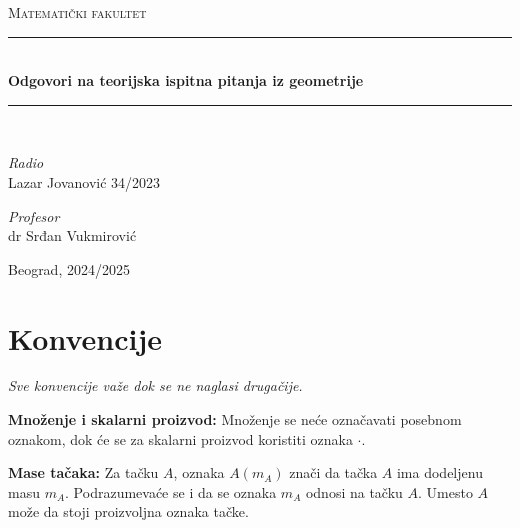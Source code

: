 \documentclass[12pt]{article}
\begin{document}
\begin{titlepage}

    \newcommand{\HRule}{\rule{\linewidth}{0.4mm}}
    \center
    \textsc{\LARGE Matematički fakultet}\\[5cm]

    \HRule\\[0.4cm]
    {\LARGE\bfseries Odgovori na teorijska ispitna pitanja iz geometrije}\\[0.2cm]
    \HRule\\[2cm]

    \vspace{17\baselineskip}
    \begin{minipage}[t]{0.4\textwidth}
        \begin{flushleft}
            \large
            \textit{Radio}\\
            Lazar Jovanović 34/2023
        \end{flushleft}
    \end{minipage}
    \hspace*{1cm}
    \begin{minipage}[t]{0.4\textwidth}
        \begin{flushright}
            \large
            \textit{Profesor}\\
            dr Srđan Vukmirović
        \end{flushright}
    \end{minipage}

    \vfill\vfill\vfill\vfill
    {\large Beograd, 2024/2025}
    \vfill

\end{titlepage}

\tableofcontents
\newpage

\section{Konvencije}
\textit{Sve konvencije važe dok se ne naglasi drugačije.}
\par
\vspace*{1cm}

\textbf{Množenje i skalarni proizvod:} Množenje se neće označavati posebnom
oznakom, dok će se za skalarni proizvod koristiti oznaka $\cdot$.
\par

\textbf{Mase tačaka:} Za tačku $A$, oznaka $A(m_A)$ znači da tačka $A$ ima
dodeljenu masu $m_A$. Podrazumevaće se i da se oznaka $m_A$ odnosi na tačku
$A$. Umesto $A$ može da stoji proizvoljna oznaka tačke.
\end{document}
